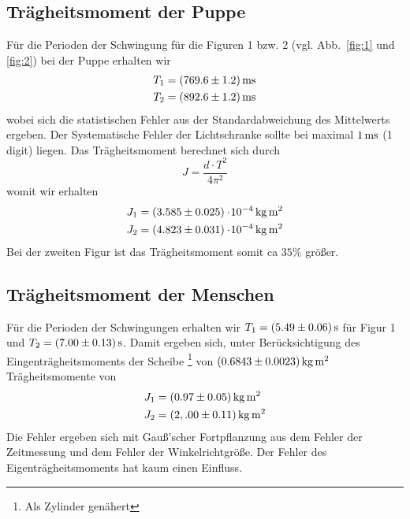 \subsection{Trägheitsmoment der Puppe}


Für die Perioden der Schwingung für die Figuren 1 bzw. 2 (vgl. Abb.~\ref{fig:1} und \ref{fig:2}) bei der Puppe erhalten wir 
%
\begin{align*}
    T_1 &= \unit[(769.6 \pm 1.2)]{ms} \\
    T_2 &= \unit[(892.6 \pm 1.2)]{ms}
\end{align*}
%
wobei sich die statistischen Fehler aus der Standardabweichung des Mittelwerts ergeben. Der Systematische Fehler der Lichtschranke sollte bei maximal $\unit[1]{ms}$ (1 digit) liegen. Das Trägheitsmoment berechnet sich durch
\[
    J = \frac{d \cdot T^2}{4 \pi^2} 
\]
womit wir erhalten
%
\begin{align*}
    J_1 &= \unit[(3.585 \pm 0.025) \e{-4}]{kg\,m^2} \\
    J_2 &= \unit[(4.823 \pm 0.031) \e{-4}]{kg\,m^2}
\end{align*}
%
Bei der zweiten Figur ist das Trägheitsmoment somit ca $35 \%$ größer.


\subsection{Trägheitsmoment der Menschen}

Für die Perioden der Schwingungen erhalten wir $T_1 = \unit[(5.49 \pm 0.06)]{s}$ für Figur 1 und $T_2 = \unit[(7.00 \pm 0.13)]{s}$. Damit ergeben sich, unter Berücksichtigung des Eingenträgheitsmoments der Scheibe%
\footnote{Als Zylinder genähert}
von $\unit[(0.6843 \pm 0.0023)]{kg\,m^2}$ Trägheitsmomente von 
%
\begin{align*}
    J_1 &= \unit[(0.97 \pm 0.05)]{kg\, m^2}\\
    J_2 &= \unit[(2,.00 \pm 0.11)]{kg\, m^2}
\end{align*}
%
Die Fehler ergeben sich mit Gauß'scher Fortpflanzung aus dem Fehler der Zeitmessung und dem Fehler der Winkelrichtgröße. Der Fehler des Eigenträgheitsmoments hat kaum einen Einfluss.

